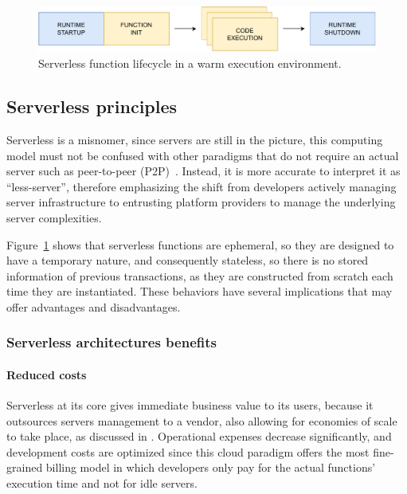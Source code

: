 \begin{figure}[H]
  \centering
  \includegraphics[width=\textwidth]{diagrams/lambda}
  \caption{Serverless function lifecycle in a warm execution environment.}
  \label{fig:serverless-functions-lifecycle}
\end{figure}

\subsection{Serverless principles}

Serverless is a misnomer, since servers are still in the picture,
this computing model must not be confused with other paradigms
that do not require an actual server such as peer-to-peer (P2P)~\cite{serverless-wikipedia}.
Instead, it is more accurate to interpret it as ``less-server'',
therefore emphasizing the shift from developers actively
managing server infrastructure to entrusting platform providers to manage the underlying server complexities.

Figure~\ref{fig:serverless-functions-lifecycle} shows that serverless functions
are ephemeral, so they are designed to have a temporary nature, and consequently
stateless, so there is no stored information of previous transactions, as they are constructed
from scratch each time they are instantiated.
These behaviors have several implications that may offer advantages and disadvantages.

\subsubsection{Serverless architectures benefits}

\paragraph{\textbf{Reduced costs}} Serverless at its core gives immediate
business value to its users, because it outsources servers management
to a vendor, also allowing for economies of scale to take place, as discussed in \cite{berkeley}.
Operational expenses decrease significantly, and development costs are optimized
since this cloud paradigm offers the most fine-grained billing model in which developers
only pay for the actual functions' execution time and not for idle servers.

